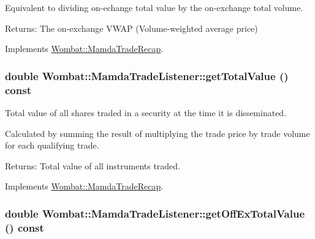 Equivalent to dividing on-echange total value by the on-exchange total volume.

\begin{Desc}
\item[Returns:]The on-exchange VWAP (Volume-weighted average price) \end{Desc}


Implements \hyperlink{classWombat_1_1MamdaTradeRecap_dd064f9710f59f8f07309dec3d11411a}{Wombat::Mamda\-Trade\-Recap}.\hypertarget{classWombat_1_1MamdaTradeListener_7b7e5520279a385cde727081db1874d3}{
\subsubsection[getTotalValue]{\setlength{\rightskip}{0pt plus 5cm}double Wombat::Mamda\-Trade\-Listener::get\-Total\-Value () const}}
\label{classWombat_1_1MamdaTradeListener_7b7e5520279a385cde727081db1874d3}


Total value of all shares traded in a security at the time it is disseminated. 

Calculated by summing the result of multiplying the trade price by trade volume for each qualifying trade.

\begin{Desc}
\item[Returns:]Total value of all instruments traded. \end{Desc}


Implements \hyperlink{classWombat_1_1MamdaTradeRecap_5dd7f2055b4a80d111661c4a1da2abb9}{Wombat::Mamda\-Trade\-Recap}.\hypertarget{classWombat_1_1MamdaTradeListener_0b0a3e74b09f916b4d202379842a243e}{
\subsubsection[getOffExTotalValue]{\setlength{\rightskip}{0pt plus 5cm}double Wombat::Mamda\-Trade\-Listener::get\-Off\-Ex\-Total\-Value () const}}
\label{classWombat_1_1MamdaTradeListener_0b0a3e74b09f916b4d202379842a243e}


